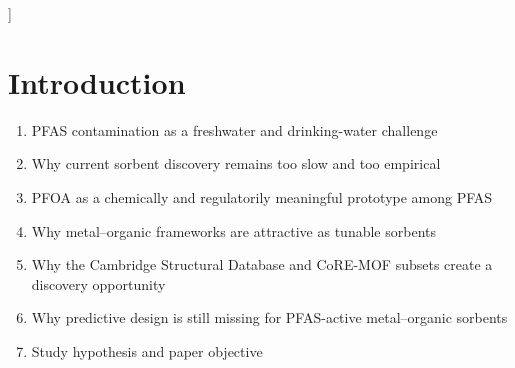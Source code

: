 \documentclass[twoside,twocolumn,9pt]{article}
\begin{document}
  ]

\renewcommand*\rmdefault{bch}\normalfont\upshape
\rmfamily

\vspace{-1cm}








\section{Introduction}
\begin{enumerate}
	\item PFAS contamination as a freshwater and drinking-water challenge
	\item Why current sorbent discovery remains too slow and too empirical
	\item PFOA as a chemically and regulatorily meaningful prototype among PFAS
	\item Why metal--organic frameworks are attractive as tunable sorbents
	\item Why the Cambridge Structural Database and CoRE-MOF subsets create a discovery opportunity
	\item Why predictive design is still missing for PFAS-active metal--organic sorbents
	\item Study hypothesis and paper objective
\end{enumerate}
\end{document}
